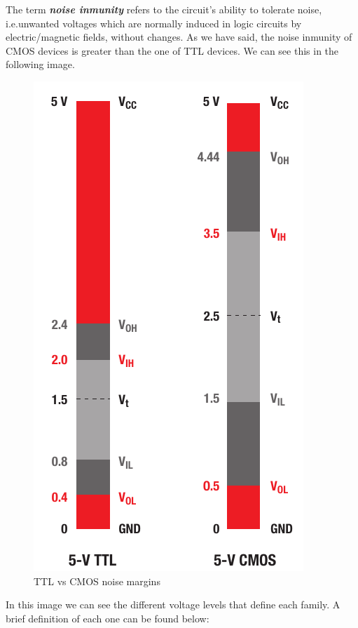 The term \textbf{\textit{noise inmunity}} refers to the circuit's ability to tolerate noise, i.e.unwanted voltages which are normally induced in logic circuits by electric/magnetic fields, without changes. As we have said, the noise inmunity of CMOS devices is greater than the one of TTL devices. We can see this in the following image. \medskip


\begin{figure}[H]
    \centering
    \includegraphics[scale = 0.8]{Graphics/Practice 8/TTL_VS_CMOS.pdf}
    \caption{TTL vs CMOS noise margins~\autocite{LOGIC_GUIDE}}
    \label{fig:TTL_VS_CMOS}
\end{figure}

In this image we can see the different voltage levels that define each family. A brief definition of each one can be found below:

